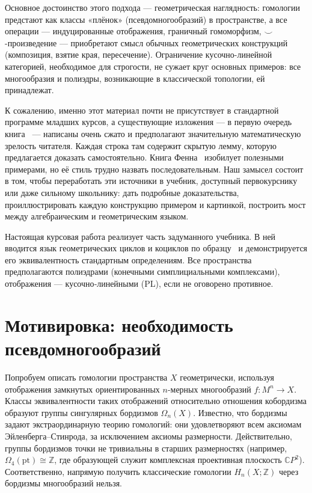 \documentclass[12pt]{article}
\begin{document}
Основное достоинство этого подхода --- геометрическая наглядность: гомологии предстают как классы «плёнок» (псевдомногообразий) в пространстве, а все операции --- индуцированные отображения, граничный гомоморфизм, $\smile$-произведение --- приобретают смысл обычных геометрических конструкций (композиция, взятие края, пересечение). Ограничение кусочно-линейной категорией, необходимое для строгости, не сужает круг основных примеров: все многообразия и полиэдры, возникающие в классической топологии, ей принадлежат.

К сожалению, именно этот материал почти не присутствует в стандартной программе младших курсов, а существующие изложения --- в первую очередь книга~\cite{BRS} --- написаны очень сжато и предполагают значительную математическую зрелость читателя. Каждая строка там содержит скрытую лемму, которую предлагается доказать самостоятельно. Книга Фенна~\cite{Fenn} изобилует полезными примерами, но её стиль трудно назвать последовательным. Наш замысел состоит в том, чтобы переработать эти источники в учебник, доступный первокурснику или даже сильному школьнику: дать подробные доказательства, проиллюстрировать каждую конструкцию примером и картинкой, построить мост между алгебраическим и геометрическим языком.

Настоящая курсовая работа реализует часть задуманного учебника. В ней вводится язык геометрических циклов и коциклов по образцу~\cite{BRS} и демонстрируется его эквивалентность стандартным определениям. Все пространства предполагаются полиэдрами (конечными симплициальными комплексами), отображения --- кусочно‑линейными (PL), если не оговорено противное.

\section{Мотивировка: необходимость псевдомногообразий}

Попробуем описать гомологии пространства $X$ геометрически, используя отображения замкнутых ориентированных $n$-мерных многообразий $f \colon M^n \to X$. Классы эквивалентности таких отображений относительно отношения кобордизма образуют группы сингулярных бордизмов $\Omega_n(X)$. Известно, что бордизмы задают экстраординарную теорию гомологий: они удовлетворяют всем аксиомам Эйленберга--Стинрода, за исключением аксиомы размерности. Действительно, группы бордизмов точки не тривиальны в старших размерностях (например, $\Omega_4(\mathrm{pt}) \cong \mathbb{Z}$, где образующей служит комплексная проективная плоскость $\mathbb{C}P^2$). Соответственно, напрямую получить классические гомологии $H_n(X; \mathbb{Z})$ через бордизмы многообразий нельзя.
\end{document}
